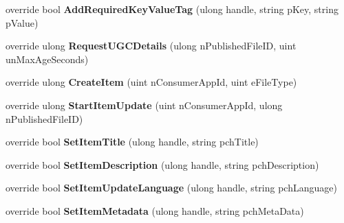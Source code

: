 \begin{DoxyCompactItemize}
\item 
\hypertarget{classValve_1_1Steamworks_1_1CSteamUGC_ab264e7b336dd432c50d051a054842634}{}override bool {\bfseries Add\+Required\+Key\+Value\+Tag} (ulong handle, string p\+Key, string p\+Value)\label{classValve_1_1Steamworks_1_1CSteamUGC_ab264e7b336dd432c50d051a054842634}

\item 
\hypertarget{classValve_1_1Steamworks_1_1CSteamUGC_a82c63eea1468dc5e8d970244c31c9d2f}{}override ulong {\bfseries Request\+U\+G\+C\+Details} (ulong n\+Published\+File\+I\+D, uint un\+Max\+Age\+Seconds)\label{classValve_1_1Steamworks_1_1CSteamUGC_a82c63eea1468dc5e8d970244c31c9d2f}

\item 
\hypertarget{classValve_1_1Steamworks_1_1CSteamUGC_aad823d6de978f22cc6b99c82e01c3b88}{}override ulong {\bfseries Create\+Item} (uint n\+Consumer\+App\+Id, uint e\+File\+Type)\label{classValve_1_1Steamworks_1_1CSteamUGC_aad823d6de978f22cc6b99c82e01c3b88}

\item 
\hypertarget{classValve_1_1Steamworks_1_1CSteamUGC_ab68ae06424a0f5e4f562e7a072110d2f}{}override ulong {\bfseries Start\+Item\+Update} (uint n\+Consumer\+App\+Id, ulong n\+Published\+File\+I\+D)\label{classValve_1_1Steamworks_1_1CSteamUGC_ab68ae06424a0f5e4f562e7a072110d2f}

\item 
\hypertarget{classValve_1_1Steamworks_1_1CSteamUGC_a7539e045eb5b415778d20ea02ee8e8eb}{}override bool {\bfseries Set\+Item\+Title} (ulong handle, string pch\+Title)\label{classValve_1_1Steamworks_1_1CSteamUGC_a7539e045eb5b415778d20ea02ee8e8eb}

\item 
\hypertarget{classValve_1_1Steamworks_1_1CSteamUGC_a6d51df1d9a7667c3d4682bdd52db46b7}{}override bool {\bfseries Set\+Item\+Description} (ulong handle, string pch\+Description)\label{classValve_1_1Steamworks_1_1CSteamUGC_a6d51df1d9a7667c3d4682bdd52db46b7}

\item 
\hypertarget{classValve_1_1Steamworks_1_1CSteamUGC_a06d586b75b91bbe2b58e94622ed7ff12}{}override bool {\bfseries Set\+Item\+Update\+Language} (ulong handle, string pch\+Language)\label{classValve_1_1Steamworks_1_1CSteamUGC_a06d586b75b91bbe2b58e94622ed7ff12}

\item 
\hypertarget{classValve_1_1Steamworks_1_1CSteamUGC_aa0306e00fdeb002795e6ddc975f0e2c4}{}override bool {\bfseries Set\+Item\+Metadata} (ulong handle, string pch\+Meta\+Data)\label{classValve_1_1Steamworks_1_1CSteamUGC_aa0306e00fdeb002795e6ddc975f0e2c4}


\end{DoxyCompactItemize}
